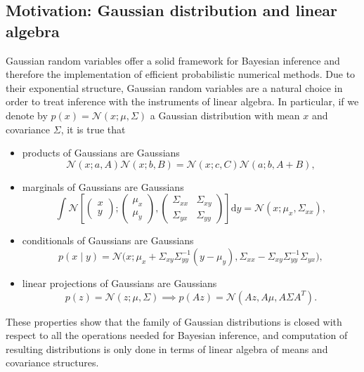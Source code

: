 \documentclass{scrartcl}
\theoremstyle{definition}
\theoremstyle{remark}
\numberwithin{definition}{section}
\numberwithin{remark}{section}
\newcommand{\dd}{\mathrm{d}}
\newcommand{\gauss}{\mathcal{N}}
\begin{document}
\subsection{Motivation: Gaussian distribution and linear algebra}
Gaussian random variables offer a solid framework for Bayesian inference and therefore the implementation of efficient probabilistic numerical methods. Due to their exponential structure, Gaussian random variables are a natural choice in order to treat inference with the instruments of linear algebra. In particular, if we denote by $p(x) = \gauss(x; \mu, \Sigma)$ a Gaussian distribution with mean $x$ and covariance $\Sigma$, it is true that 
\begin{itemize}
	\item products of Gaussians are Gaussians $$\gauss(x;a,A)\gauss(x;b,B) = \gauss(x;c,C)\gauss(a;b,A+B),$$
	\item marginals of Gaussians are Gaussians 
	\begin{equation}
		\int \gauss\left[\begin{pmatrix}x \\ y\end{pmatrix}; \begin{pmatrix}\mu_x \\ \mu_y\end{pmatrix}, \begin{pmatrix} \Sigma_{xx} & \Sigma_{xy} \\ \Sigma_{yx} & \Sigma_{yy} \end{pmatrix}\right] \dd y = \gauss(x;\mu_x, \Sigma_{xx}),
	\end{equation}
	\item conditionals of Gaussians are Gaussians $$p(x\mid y) = \gauss\big(x;\mu_x + \Sigma_{xy}\Sigma_{yy}^{-1}(y - \mu_y), \Sigma_{xx} - \Sigma_{xy}\Sigma_{yy}^{-1}\Sigma_{yx}\big),$$
	\item linear projections of Gaussians are Gaussians $$p(z) = \gauss(z; \mu, \Sigma) \implies p(Az) = \gauss(Az, A\mu, A\Sigma A^T). $$
\end{itemize}
These properties show that the family of Gaussian distributions is closed with respect to all the operations needed for Bayesian inference, and computation of resulting distributions is only done in terms of linear algebra of means and covariance structures.
\end{document}
